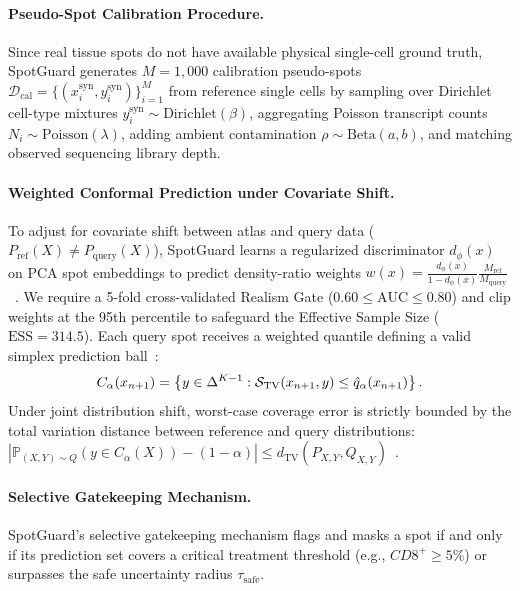 \documentclass[pmlr,twocolumn,10pt]{jmlr}
\newcommand{\simplex}{\Delta^{K-1}}
\begin{document}
\paragraph{Pseudo-Spot Calibration Procedure.}
Since real tissue spots do not have available physical single-cell ground truth, SpotGuard generates $M=1{,}000$ calibration pseudo-spots $\mathcal{D}_{\text{cal}} = \{(x_i^{\text{syn}}, y_i^{\text{syn}})\}_{i=1}^M$ from reference single cells by sampling over Dirichlet cell-type mixtures $y_i^{\text{syn}} \sim \mathrm{Dirichlet}(\beta)$, aggregating Poisson transcript counts $N_i \sim \mathrm{Poisson}(\lambda)$, adding ambient contamination $\rho \sim \mathrm{Beta}(a, b)$, and matching observed sequencing library depth.

\paragraph{Weighted Conformal Prediction under Covariate Shift.}
To adjust for covariate shift between atlas and query data ($P_{\text{ref}}(X) \neq P_{\text{query}}(X)$), SpotGuard learns a regularized discriminator $d_\phi(x)$ on PCA spot embeddings to predict density-ratio weights $w(x) = \frac{d_\phi(x)}{1 - d_\phi(x)} \frac{M_{\text{ref}}}{M_{\text{query}}}$~\citep{tibshirani2019conformal, barber2023conformal}. We require a 5-fold cross-validated Realism Gate ($0.60 \le \text{AUC} \le 0.80$) and clip weights at the 95th percentile to safeguard the Effective Sample Size ($\text{ESS} = 314.5$). Each query spot receives a weighted quantile defining a valid simplex prediction ball~\citep{angelopoulos2021gentle}:
\begin{equation}
\vspace{-3pt}
    C_\alpha(x_{n+1}) = \left\{ y \in \simplex : \mathcal{S}_{\text{TV}}(x_{n+1}, y) \le \hat{q}_\alpha(x_{n+1}) \right\}.
\vspace{-3pt}
\end{equation}
Under joint distribution shift, worst-case coverage error is strictly bounded by the total variation distance between reference and query distributions: $|\mathbb{P}_{(X,Y)\sim Q}(y \in C_\alpha(X)) - (1-\alpha)| \le d_{\mathrm{TV}}(P_{X,Y}, Q_{X,Y})$~\citep{barber2023conformal}.

\paragraph{Selective Gatekeeping Mechanism.}
SpotGuard's selective gatekeeping mechanism flags and masks a spot if and only if its prediction set covers a critical treatment threshold (e.g., $CD8^+ \ge 5\%$) or surpasses the safe uncertainty radius $\tau_{\text{safe}}$.
\end{document}
